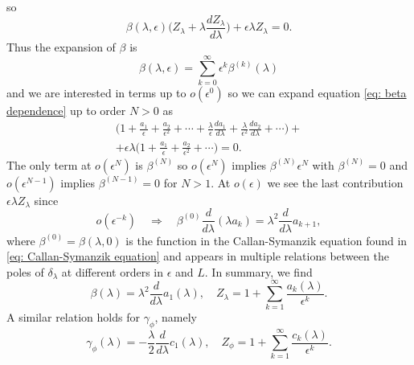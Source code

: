 so 
\begin{equation}
\label{eq: beta dependence}
    \beta(\lambda,\epsilon)\bigg(Z_\lambda + \lambda\frac{dZ_\lambda}{d\lambda}\bigg) + \epsilon\lambda Z_\lambda = 0.
\end{equation}
Thus the expansion of $\beta$ is 
\begin{equation}
    \beta(\lambda,\epsilon) = \sum_{k=0}^\infty\epsilon^k\beta^{(k)}(\lambda)
\end{equation}
and we are interested in terms up to $o(\epsilon^0)$ so we can expand equation \eqref{eq: beta dependence} up to order $N > 0$ as
\begin{multline}
    [\beta^{(0)} + \cdots + \epsilon^N\beta^{(N)}]\bigg(1 + \frac{a_1}{\epsilon} + \frac{a_2}{\epsilon^2} + \cdots + \frac{\lambda}{\epsilon}\frac{da_1}{d\lambda} + \frac{\lambda}{\epsilon^2}\frac{da_2}{d\lambda} + \cdots\bigg) + \\
    + \epsilon\lambda\bigg(1 + \frac{a_1}{\epsilon} + \frac{a_2}{\epsilon^2} + \cdots\bigg) = 0.
\end{multline}
The only term at $o(\epsilon^N)$ is $\beta^{(N)}$ so $o(\epsilon^N)$ implies $\beta^{(N)}\epsilon^N$ with $\beta^{(N)} = 0$ and $o(\epsilon^{N-1})$ implies $\beta^{(N - 1)} = 0$ for $N > 1$. At $o(\epsilon)$ we see the last contribution $\epsilon\lambda Z_\lambda$ since
\begin{equation}
    o(\epsilon^{-k})\quad\Longrightarrow\quad \beta^{(0)}\frac{d}{d\lambda}(\lambda a_k) = \lambda^2\frac{d}{d\lambda}a_{k + 1},
\end{equation}
where $\beta^{(0)} = \beta(\lambda,0)$ is the function in the Callan-Symanzik equation found in \eqref{eq: Callan-Symanzik equation} and appears in multiple relations between the poles of $\delta_\lambda$ at different orders in $\epsilon$ and $L$. In summary, we find 
\begin{equation}
    \beta(\lambda) = \lambda^2\frac{d}{d\lambda}a_1(\lambda),\quad Z_\lambda = 1 + \sum_{k=1}^\infty\frac{a_k(\lambda)}{\epsilon^k}.
\end{equation}
A similar relation holds for $\gamma_\phi$, namely
\begin{equation}
    \gamma_\phi(\lambda) = -\frac{\lambda}{2}\frac{d}{d\lambda}c_1(\lambda),\quad Z_\phi = 1 + \sum_{k=1}^\infty\frac{c_k(\lambda)}{\epsilon^k}.
\end{equation}
